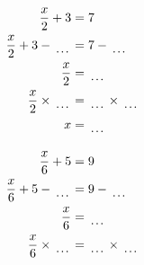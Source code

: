 \documentclass[12pt]{article}
\newcounter{minipagecount}
\begin{document}
\begin{multicols}{2}
\begin{minipage}[t]{0.45\textwidth}
    \raggedright %
    \begin{align*} %
        \frac{x}{2} + 3 &= 7\\
        \frac{x}{2} + 3 - \dotuline{\hspace{5mm}} &= 7 - \dotuline{\hspace{5mm}}\\
        \frac{x}{2} &= \dotuline{\hspace{5mm}}\\
        \frac{x}{2} \times\dotuline{\hspace{5mm}} &= \dotuline{\hspace{5mm}} \times\dotuline{\hspace{5mm}}\\
        x &= \dotuline{\hspace{5mm}}\\
    \end{align*}
\end{minipage}\columnbreak
\noindent{(\theminipagecount)}\hspace{0.1mm} %
\begin{minipage}[t]{0.45\textwidth} %
    \vspace{-26pt}  %
    \raggedright %
    \begin{align*} %
        \frac{x}{6} + 5 &= 9\\
        \frac{x}{6} + 5 - \dotuline{\hspace{5mm}} &= 9 - \dotuline{\hspace{5mm}}\\
        \frac{x}{6} &= \dotuline{\hspace{5mm}}\\
        \frac{x}{6} \times\dotuline{\hspace{5mm}} &= \dotuline{\hspace{5mm}} \times\dotuline{\hspace{5mm}}\\

\end{align*}
\end{minipage}
\end{multicols}
\end{document}
